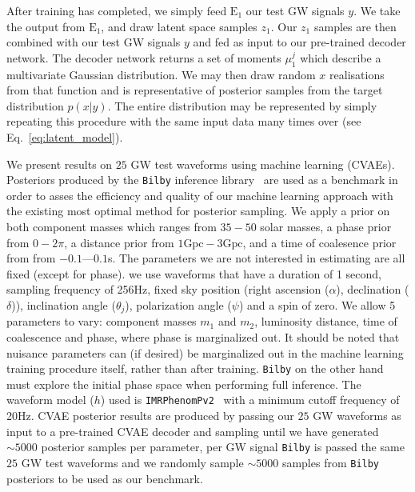 \documentclass[%
showpacs,
 amsmath,amssymb,
 aps,
 twocolumn,
 prl,
 reprint,
floatfix,
]{revtex4-1}
\begin{document}
%
%
After training has completed, we simply feed $\textrm{E}_1$ our test GW signals
$y$. We take the output from $\textrm{E}_1$, and draw latent space samples 
$z_1$. Our
$z_1$ samples are then combined with our test GW signals $y$ and fed
as input to our pre-trained decoder network. The decoder network returns a set
of moments $\mu^{j}_1$ which describe a multivariate Gaussian distribution.
We may then draw random $x$ realisations from that function and is representative of posterior samples from the target
distribution $p(x|y)$. The entire distribution may be represented by 
simply repeating this procedure with the same input data many times over  
(see Eq.~\ref{eq:latent_model}).

%
%
We present results on $25$ \ac{GW} test waveforms using machine learning 
(\ac{CVAE}s). Posteriors produced by the \texttt{Bilby} inference library~\cite{1811.02042} are used as a benchmark 
in order to asses the efficiency and quality of our machine learning approach 
with the existing most optimal method for posterior sampling. We apply a prior on both component masses which ranges from $35 - 50$
solar masses, a phase prior from $0 - 2\pi$, a distance prior from  $1\textrm{Gpc} - 3\textrm{Gpc}$, and a time of coalesence prior from
from $-0.1$---$0.1$s. The parameters we are not interested in estimating are all fixed (except for phase). we use waveforms that have a duration of 1 second, sampling frequency
of 256Hz, fixed sky position (right ascension ($\alpha$), declination ($\delta$)), inclination angle ($\theta_j$), polarization angle ($\psi$) and a spin of zero. We allow 5 parameters to vary: component masses $m_1$ and $m_2$, luminosity
distance, time of coalescence and phase, where phase is marginalized
out. It should be noted that nuisance parameters can (if desired) be 
marginalized out in the machine learning training procedure itself, rather 
than after training. \texttt{Bilby} on the other hand must explore the initial 
phase space when performing full inference. The waveform
model ($h$) used is
\texttt{IMRPhenomPv2}~\cite{1809.10113} with a minimum cutoff frequency of
20Hz. \ac{CVAE} posterior results are produced by passing our $25$ \ac{GW} 
waveforms as input to a pre-trained \ac{CVAE} decoder and sampling until we have 
generated $\sim5000$ posterior samples per parameter, per \ac{GW} signal 
\texttt{Bilby} is passed the same $25$ \ac{GW} test waveforms and we randomly sample $\sim5000$ samples from \texttt{Bilby} posteriors to be used as our benchmark.
\end{document}
